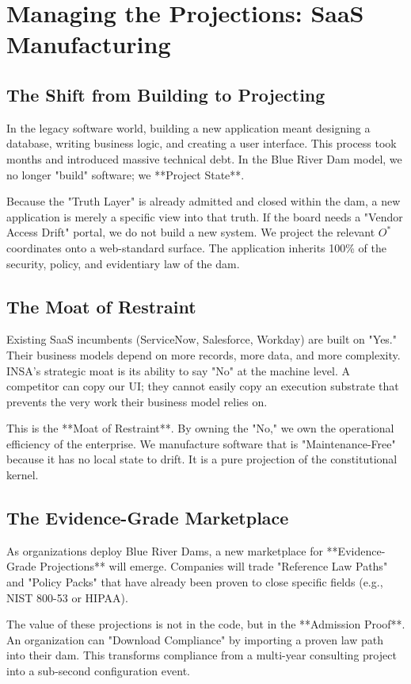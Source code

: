 \documentclass[12pt,a4paper,oneside]{book}
\begin{document}
\chapter{Managing the Projections: SaaS Manufacturing}

\section{The Shift from Building to Projecting}
In the legacy software world, building a new application meant designing a database, writing business logic, and creating a user interface. This process took months and introduced massive technical debt. In the Blue River Dam model, we no longer "build" software; we **Project State**.

Because the "Truth Layer" is already admitted and closed within the dam, a new application is merely a specific view into that truth. If the board needs a "Vendor Access Drift" portal, we do not build a new system. We project the relevant $O^*$ coordinates onto a web-standard surface. The application inherits 100\% of the security, policy, and evidentiary law of the dam.

\section{The Moat of Restraint}
Existing SaaS incumbents (ServiceNow, Salesforce, Workday) are built on "Yes." Their business models depend on more records, more data, and more complexity. INSA’s strategic moat is its ability to say "No" at the machine level. A competitor can copy our UI; they cannot easily copy an execution substrate that prevents the very work their business model relies on. 

This is the **Moat of Restraint**. By owning the "No," we own the operational efficiency of the enterprise. We manufacture software that is "Maintenance-Free" because it has no local state to drift. It is a pure projection of the constitutional kernel.

\section{The Evidence-Grade Marketplace}
As organizations deploy Blue River Dams, a new marketplace for **Evidence-Grade Projections** will emerge. Companies will trade "Reference Law Paths" and "Policy Packs" that have already been proven to close specific fields (e.g., NIST 800-53 or HIPAA). 

The value of these projections is not in the code, but in the **Admission Proof**. An organization can "Download Compliance" by importing a proven law path into their dam. This transforms compliance from a multi-year consulting project into a sub-second configuration event.
\end{document}
